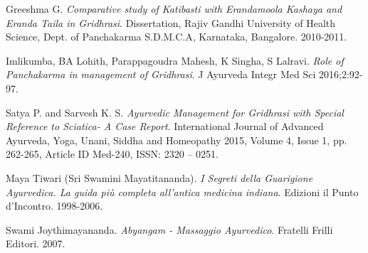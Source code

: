 \begin{thebibliography}{3}
 Greeshma G. \textit{Comparative study of Katibasti with Erandamoola Kashaya and Eranda Taila in Gridhrasi}. Dissertation, Rajiv Gandhi University of Health Science, Dept. of Panchakarma S.D.M.C.A, Karnataka, Bangalore. 2010-2011.


 Imlikumba, BA Lohith, Parappagoudra Mahesh, K Singha, S Lalravi. \textit{Role of
Panchakarma in management of Gridhrasi}. J Ayurveda Integr Med Sci 2016;2:92-97.


 Satya P. and Sarvesh K. S. \textit{Ayurvedic Management for Gridhrasi with Special Reference to Sciatica- A Case Report}. International Journal of Advanced Ayurveda, Yoga, Unani, Siddha and Homeopathy 2015, Volume 4, Issue 1, pp. 262-265, Article ID Med-240, ISSN: 2320 – 0251.








 Maya Tiwari (Sri Swamini Mayatitananda). \textit{I Segreti della Guarigione Ayurvedica. La guida più completa all'antica medicina indiana}. Edizioni il Punto d'Incontro. 1998-2006.



 Swami Joythimayananda. \textit{Abyangam - Massaggio Ayurvedico}. Fratelli Frilli Editori. 2007. 




\end{thebibliography} 

